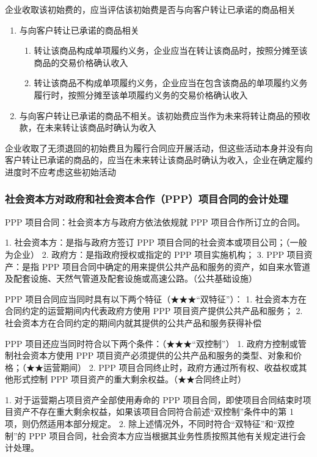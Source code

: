 \documentclass[UTF8,12pt]{ctexart}
\numberwithin{equation}{section} %
\numberwithin{figure}{section}
\numberwithin{table}{section}
\begin{document}
	企业收取该初始费的，应当评估该初始费是否与向客户转让已承诺的商品相关
	\begin{enumerate}
		\item 与向客户转让已承诺的商品相关
		\begin{enumerate}
			\item 转让该商品构成单项履约义务，企业应当在转让该商品时，按照分摊至该商品的交易价格确认收入
			
			\item 转让该商品不构成单项履约义务，企业应当在包含该商品的单项履约义务履行时，按照分摊至该单项履约义务的交易价格确认收入
		\end{enumerate}
		
		\item 与向客户转让已承诺的商品不相关。该初始费应当作为未来将转让商品的预收款，在未来转让该商品时确认为收入
	\end{enumerate}

	企业收取了无须退回的初始费且为履行合同应开展活动，但这些活动本身并没有向客户转让已承诺的商品的，应当在未来转让该商品时确认为收入，企业在确定履约进度时不应考虑这些初始活动
	
	\subsubsection{社会资本方对政府和社会资本合作（PPP）项目合同的会计处理}
	PPP 项目合同：社会资本方与政府方依法依规就 PPP 项目合作所订立的合同。
	
	1.	社会资本方：是指与政府方签订 PPP 项目合同的社会资本或项目公司；（一般为企业）
	2.	政府方：是指政府授权或指定的 PPP 项目实施机构；
	3.	PPP 项目资产：是指 PPP 项目合同中确定的用来提供公共产品和服务的资产，如自来水管道及配套设施、天然气管道及配套设施或高速公路。（公共基础设施）
	
	PPP 项目合同应当同时具有以下两个特征（★★★“双特征”）：
	1.	社会资本方在合同约定的运营期间内代表政府方使用 PPP 项目资产提供公共产品和服务；
	2.	社会资本方在合同约定的期间内就其提供的公共产品和服务获得补偿
	
	PPP 项目还应当同时符合以下两个条件：（★★★“双控制”）
	1.	政府方控制或管制社会资本方使用 PPP 项目资产必须提供的公共产品和服务的类型、对象和价格；（★★运营期间）
	2.	PPP 项目合同终止时，政府方通过所有权、收益权或其他形式控制 PPP 项目资产的重大剩余权益。（★★合同终止时）
	
	1.	对于运营期占项目资产全部使用寿命的 PPP 项目合同，即使项目合同结束时项目资产不存在重大剩余权益，如果该项目合同符合前述“双控制”条件中的第 1 项，则仍然适用本部分规定。
	2.	除上述情况外，不同时符合“双特征”和“双控制”的 PPP 项目合同，社会资本方应当根据其业务性质按照其他有关规定进行会计处理。
	
\end{document}
